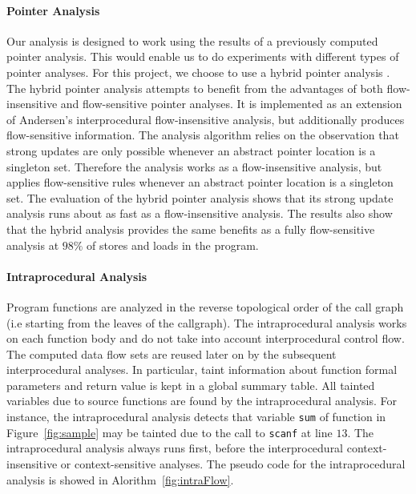 \paragraph{Pointer Analysis}
Our analysis is designed to work using the results of
a previously computed pointer analysis. This would enable us to
do experiments with different types of pointer
analyses. For this project, we choose to use a hybrid
pointer analysis \cite{Lhotak:2011:PAE}. The hybrid
pointer analysis attempts to benefit from the
advantages of both flow-insensitive and flow-sensitive 
pointer analyses. It is implemented as an extension of
Andersen's interprocedural flow-insensitive analysis, but
additionally produces flow-sensitive information. The analysis
algorithm relies on the observation that strong updates
are only possible whenever an abstract pointer location is
a singleton set. Therefore the analysis works as a
flow-insensitive analysis, but applies flow-sensitive
rules whenever an abstract pointer location is a singleton set.
The evaluation of the hybrid pointer analysis shows that its
strong update analysis runs about as fast as a flow-insensitive analysis.
The results also show that the hybrid
analysis provides the same benefits as a fully flow-sensitive
analysis at $98\%$ of stores and loads in the program.

\paragraph{Intraprocedural Analysis}
Program functions are analyzed in the reverse
topological order of the call graph (i.e starting
from the leaves of the callgraph).
The intraprocedural analysis works on each function
body and do not take into account interprocedural
control flow. The computed data flow sets are reused
later on by the subsequent interprocedural analyses.
In particular, taint information about function
formal parameters and return value is kept in a
global summary table.
All tainted variables due to source functions are
found by the intraprocedural analysis. 
For instance, the intraprocedural analysis detects
that variable \texttt{sum} of function \compute{}
in Figure~\ref{fig:sample} may be tainted due to the
call to \texttt{scanf} at line $13$.
The intraprocedural analysis always runs
first, before the interprocedural context-insensitive
or context-sensitive analyses.
The pseudo code for the intraprocedural analysis
is showed in Alorithm~\ref{fig:intraFlow}.

